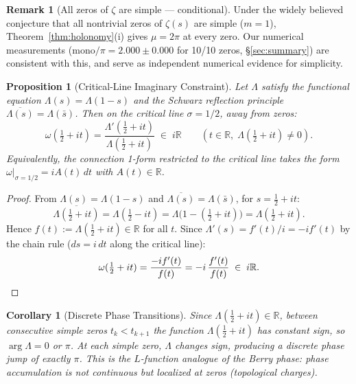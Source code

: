 \documentclass[11pt, a4paper]{article}
\theoremstyle{definition}
\newtheorem{remark}{Remark}[section]
\theoremstyle{plain}
\newtheorem{proposition}[theorem]{Proposition}
\newtheorem{corollary}[theorem]{Corollary}
\begin{document}
\begin{remark}[All zeros of $\zeta$ are simple --- conditional]
\label{rem:simple_zeros}
Under the widely believed conjecture that all nontrivial zeros of
$\zeta(s)$ are simple ($m = 1$), Theorem~\ref{thm:holonomy}(i)
gives $\mu = 2\pi$ at every zero. Our numerical measurements
(mono$/\pi = 2.000 \pm 0.000$ for 10/10 zeros, \S\ref{sec:summary})
are consistent with this, and serve as independent numerical evidence
for simplicity.
\end{remark}

\begin{proposition}[Critical-Line Imaginary Constraint]
\label{prop:imaginary_connection}
Let $\Lambda$ satisfy the functional equation $\Lambda(s) = \Lambda(1-s)$
and the Schwarz reflection principle $\overline{\Lambda(s)} = \Lambda(\bar{s})$.
Then on the critical line $\sigma = 1/2$, away from zeros:
\begin{equation}
  \omega\!\left(\tfrac{1}{2} + it\right)
  = \frac{\Lambda'(\tfrac{1}{2}+it)}{\Lambda(\tfrac{1}{2}+it)}
  \;\in\; i\mathbb{R}
  \qquad (t \in \mathbb{R},\; \Lambda(\tfrac{1}{2}+it) \neq 0).
  \label{eq:purely_imaginary}
\end{equation}
Equivalently, the connection 1-form restricted to the critical line
takes the form $\omega|_{\sigma=1/2} = iA(t)\,dt$ with $A(t) \in \mathbb{R}$.
\end{proposition}

\begin{proof}
From $\Lambda(s) = \Lambda(1-s)$ and
$\overline{\Lambda(s)} = \Lambda(\bar{s})$, for $s = \tfrac{1}{2}+it$:
\[
  \overline{\Lambda(\tfrac{1}{2}+it)}
  = \Lambda(\tfrac{1}{2}-it)
  = \Lambda\bigl(1 - (\tfrac{1}{2}+it)\bigr)
  = \Lambda(\tfrac{1}{2}+it).
\]
Hence $f(t) := \Lambda(\tfrac{1}{2}+it) \in \mathbb{R}$ for all $t$.
Since $\Lambda'(s) = f'(t)/i = -if'(t)$ by the chain rule
($ds = i\,dt$ along the critical line):
\[
  \omega(\tfrac{1}{2}+it)
  = \frac{-if'(t)}{f(t)}
  = -i\,\frac{f'(t)}{f(t)}
  \;\in\; i\mathbb{R}. \qedhere
\]
\end{proof}

\begin{corollary}[Discrete Phase Transitions]
\label{cor:discrete_phase}
Since $\Lambda(\tfrac{1}{2}+it) \in \mathbb{R}$, between consecutive
simple zeros $t_k < t_{k+1}$ the function $\Lambda(\tfrac{1}{2}+it)$
has constant sign, so $\arg\Lambda = 0$ or $\pi$. At each simple zero,
$\Lambda$ changes sign, producing a discrete phase jump of exactly $\pi$.
This is the $L$-function analogue of the Berry phase:
phase accumulation is not continuous but localized at zeros
(topological charges).
\end{corollary}
\end{document}
